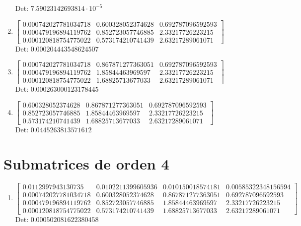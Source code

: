 \documentclass[12pt]{article}
\begin{document}
\begin{enumerate}
Det: $7.59023142693814 \cdot 10^{-5}$\\

\item $\displaystyle \left[\begin{matrix}0.000742027781034718 & 0.600328052374628 & 0.692787096592593\\0.000479196894119762 & 0.852723057746885 & 2.33217726223215\\0.000120818754775022 & 0.573174210741439 & 2.63217289061071\end{matrix}\right]$\\

Det: $0.000204443548624507$\\

\item $\displaystyle \left[\begin{matrix}0.000742027781034718 & 0.867871277363051 & 0.692787096592593\\0.000479196894119762 & 1.85844463969597 & 2.33217726223215\\0.000120818754775022 & 1.68825713677033 & 2.63217289061071\end{matrix}\right]$\\

Det: $0.000263000123178445$\\

\item $\displaystyle \left[\begin{matrix}0.600328052374628 & 0.867871277363051 & 0.692787096592593\\0.852723057746885 & 1.85844463969597 & 2.33217726223215\\0.573174210741439 & 1.68825713677033 & 2.63217289061071\end{matrix}\right]$\\

Det: $0.0445263813571612$\\

\end{enumerate}


\section*{Submatrices de orden 4}

\begin{enumerate}

\item $\displaystyle \left[\begin{matrix}0.0112997943130735 & 0.0102211399605936 & 0.010150018574181 & 0.00585322348156594\\0.000742027781034718 & 0.600328052374628 & 0.867871277363051 & 0.692787096592593\\0.000479196894119762 & 0.852723057746885 & 1.85844463969597 & 2.33217726223215\\0.000120818754775022 & 0.573174210741439 & 1.68825713677033 & 2.63217289061071\end{matrix}\right]$\\

Det: $0.000502081622380458$\\

\end{enumerate}
\end{document}
